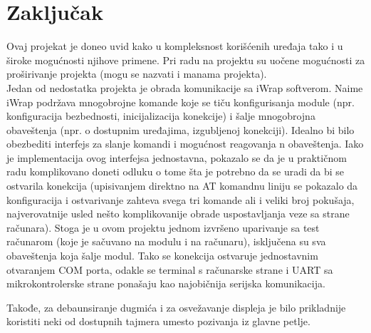 \section{Zaključak}
Ovaj projekat je doneo uvid kako u kompleksnost korišćenih uređaja tako i u široke mogućnosti njihove primene. Pri radu na projektu su uočene mogućnosti za proširivanje  projekta (mogu se nazvati i manama projekta).\\

Jedan od nedostatka projekta je obrada komunikacije sa iWrap softverom. Naime iWrap podržava mnogobrojne komande koje se tiču konfigurisanja module (npr. konfiguracija bezbednosti, inicijalizacija konekcije) i šalje mnogobrojna obaveštenja (npr. o dostupnim uređajima, izgubljenoj konekciji). Idealno bi bilo obezbediti interfejs za slanje komandi i mogućnost reagovanja n obaveštenja. Iako je implementacija ovog interfejsa jednostavna, pokazalo se da je u praktičnom radu komplikovano doneti odluku o tome šta je potrebno da se uradi da bi se ostvarila konekcija (upisivanjem direktno na AT komandnu liniju se pokazalo da konfiguracija i ostvarivanje zahteva svega tri komande ali i veliki broj pokušaja, najverovatnije usled nešto komplikovanije obrade uspostavljanja veze sa strane računara). Stoga je u ovom projektu jednom izvršeno uparivanje sa test računarom (koje je sačuvano na modulu i na računaru), isključena su sva obaveštenja koja šalje modul. Tako se konekcija ostvaruje jednostavnim otvaranjem COM porta, odakle se terminal s računarske strane i UART sa mikrokontrolerske strane ponašaju kao najobičnija serijska komunikacija.

Takođe, za debaunsiranje dugmića i za osvežavanje displeja je bilo prikladnije koristiti neki od dostupnih tajmera umesto pozivanja iz glavne petlje.